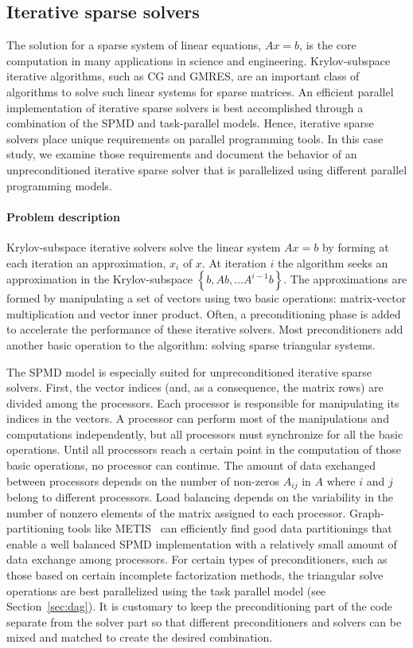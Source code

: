 \documentclass{sig-alternate}
\begin{document}
\subsection{Iterative sparse solvers}
\label{sec:cg}
The solution for a sparse system of linear equations, $Ax=b$, is the core
computation in many applications in science and engineering. Krylov-subspace
iterative algorithms, such as CG and GMRES, are an important class of
algorithms to solve such linear systems for sparse matrices.  An efficient
parallel implementation of iterative sparse solvers is best accomplished
through a combination of the SPMD and task-parallel models. Hence,
iterative sparse solvers place unique requirements on parallel programming
tools.  In this case study, we examine those requirements and document the
behavior of an unpreconditioned iterative sparse solver that is parallelized
using different parallel programming models.

\paragraph{Problem description}
Krylov-subspace iterative solvers solve the linear system $Ax=b$ by forming at
each iteration an approximation, $x_i$ of $x$. At iteration $i$ the algorithm
seeks an approximation in the Krylov-subspace $\left\{ b,Ab,\dots
A^{i-1}b\right\} $.  The approximations are formed by manipulating a set of
vectors using two basic operations: matrix-vector multiplication and vector
inner product. Often, a preconditioning phase is added to accelerate the
performance of these iterative solvers. Most preconditioners add another basic
operation to the algorithm: solving sparse triangular systems. 

The SPMD model is especially suited for unpreconditioned iterative sparse
solvers.  First, the vector indices (and, as a consequence, the matrix rows)
are divided among the processors. Each processor is responsible for
manipulating its indices in the vectors. A processor can perform most of the
manipulations and computations independently, but all processors must
synchronize for all the basic operations.  Until all processors reach a certain
point in the computation of those basic operations, no processor can continue.
The amount of data exchanged between processors depends on the number of
non-zeros $A_{ij}$ in $A$ where $i$ and $j$ belong to different processors.
Load balancing depends on the variability in the number of nonzero elements of
the matrix assigned to each processor.  
Graph-partitioning tools like METIS~\cite{MetisPaper} can
efficiently find good data partitionings that enable a well balanced SPMD
implementation with a relatively small amount of data exchange among
processors.
%
For certain types of preconditioners, such as those based on certain incomplete
factorization methods, the triangular solve operations are best parallelized
using the task parallel model (see Section~\ref{sec:dag}).  It is customary to keep the preconditioning
part of the code separate from the solver part so that different
preconditioners and solvers can be mixed and matched to create the desired
combination.
\end{document}
